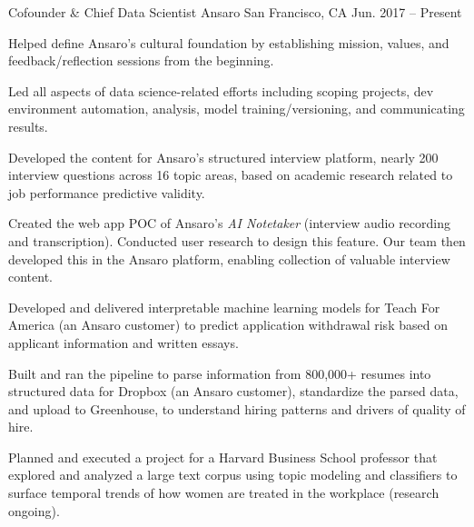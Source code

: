 

\begin{cventries}

  \cventry
    {Cofounder \& Chief Data Scientist} %
    {Ansaro} %
    {San Francisco, CA} %
    {Jun. 2017 -- Present} %
    {
      \begin{cvitems} %
        \item {Helped define Ansaro's cultural foundation by establishing mission, values, and feedback/reflection sessions from the beginning.}
        \item {Led all aspects of data science-related efforts including scoping projects, dev environment automation, analysis, model training/versioning, and communicating results.}
        \item {Developed the content for Ansaro's structured interview platform, nearly 200 interview questions across 16 topic areas, based on academic research related to job performance predictive validity.}
        \item {Created the web app POC of Ansaro's \textit{AI Notetaker} (interview audio recording and transcription). Conducted user research to design this feature. Our team then developed this in the Ansaro platform, enabling collection of valuable interview content.}
        \item {Developed and delivered interpretable machine learning models for Teach For America (an Ansaro customer) to predict application withdrawal risk based on applicant information and written essays.}
        \item {Built and ran the pipeline to parse information from 800,000+ resumes into structured data for Dropbox (an Ansaro customer), standardize the parsed data, and upload to Greenhouse, to understand hiring patterns and drivers of quality of hire.}
        \item {Planned and executed a project for a Harvard Business School professor that explored and analyzed a large text corpus using topic modeling and classifiers to surface temporal trends of how women are treated in the workplace (research ongoing).}

\end{cvitems}}
\end{cventries}
